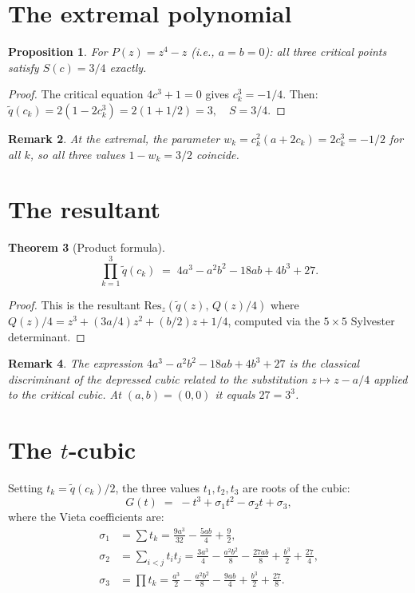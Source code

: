 \documentclass[11pt,a4paper]{article}
\newtheorem{theorem}{Theorem}[section]
\newtheorem{proposition}[theorem]{Proposition}
\newtheorem{remark}[theorem]{Remark}
\begin{document}
\section{The extremal polynomial}

\begin{proposition}
For $P(z) = z^4 - z$ (i.e., $a = b = 0$): all three critical points satisfy $S(c) = 3/4$ exactly.
\end{proposition}

\begin{proof}
The critical equation $4c^3 + 1 = 0$ gives $c_k^3 = -1/4$. Then:
$\tilde{q}(c_k) = 2(1 - 2c_k^3) = 2(1 + 1/2) = 3, \quad S = 3/4.$ \qedhere
\end{proof}

\begin{remark}
At the extremal, the parameter $w_k = c_k^2 (a + 2c_k) = 2c_k^3 = -1/2$ for all $k$, so all three values $1 - w_k = 3/2$ coincide.
\end{remark}

\section{The resultant}

\begin{theorem}[Product formula]
\begin{equation}
\prod_{k=1}^3 \tilde{q}(c_k) \;=\; 4a^3 - a^2 b^2 - 18 ab + 4b^3 + 27.
\end{equation}
\end{theorem}

\begin{proof}
This is the resultant $\mathrm{Res}_z(\tilde{q}(z),\, Q(z)/4)$ where $Q(z)/4 = z^3 + (3a/4)z^2 + (b/2)z + 1/4$, computed via the $5 \times 5$ Sylvester determinant.
\end{proof}

\begin{remark}
The expression $4a^3 - a^2 b^2 - 18 ab + 4b^3 + 27$ is the classical \emph{discriminant} of the depressed cubic related to the substitution $z \mapsto z - a/4$ applied to the critical cubic. At $(a, b) = (0, 0)$ it equals $27 = 3^3$.
\end{remark}

\section{The $t$-cubic}

Setting $t_k = \tilde{q}(c_k)/2$, the three values $t_1, t_2, t_3$ are roots of the cubic:
\begin{equation}
G(t) \;=\; -t^3 + \sigma_1 t^2 - \sigma_2 t + \sigma_3,
\end{equation}
where the Vieta coefficients are:
\begin{align}
\sigma_1 &= \sum t_k = \frac{9 a^3}{32} - \frac{5 ab}{4} + \frac{9}{2}, \\
\sigma_2 &= \sum_{i < j} t_i t_j = \frac{3 a^3}{4} - \frac{a^2 b^2}{8} - \frac{27 ab}{8} + \frac{b^3}{2} + \frac{27}{4}, \\
\sigma_3 &= \prod t_k = \frac{a^3}{2} - \frac{a^2 b^2}{8} - \frac{9 ab}{4} + \frac{b^3}{2} + \frac{27}{8}.
\end{align}
\end{document}
